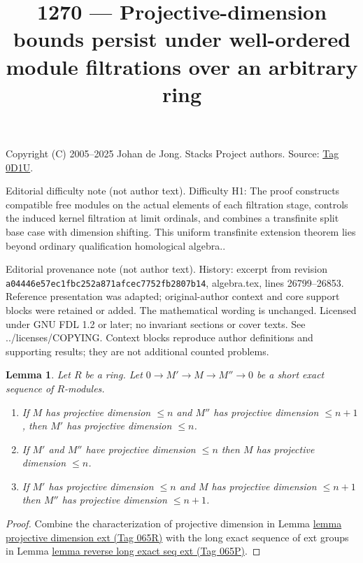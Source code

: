 \documentclass{amsart}
\theoremstyle{plain}
\newtheorem{lemma}[subsection]{Lemma}
\theoremstyle{definition}
\theoremstyle{remark}
\numberwithin{equation}{subsection}
\begin{document}
\title[Stacks Project, Tag 0D1U]{1270 --- Projective-dimension bounds persist under well-ordered module filtrations over an arbitrary ring}
\maketitle
\noindent Copyright (C) 2005--2025 Johan de Jong. Stacks Project authors. Source: \href{https://stacks.math.columbia.edu/tag/0D1U}{Tag 0D1U}.

\noindent Editorial difficulty note (not author text). Difficulty H1: The proof constructs compatible free modules on the actual elements of each filtration stage, controls the induced kernel filtration at limit ordinals, and combines a transfinite split base case with dimension shifting. This uniform transfinite extension theorem lies beyond ordinary qualification homological algebra..

\noindent Editorial provenance note (not author text). History: excerpt from revision \texttt{a0444\allowbreak 6e57e\allowbreak c1fbc\allowbreak 252a8\allowbreak 71afc\allowbreak ec775\allowbreak 2fb28\allowbreak 07b14}, algebra.tex, lines 26799--26853. Reference presentation was adapted; original-author context and core support blocks were retained or added. The mathematical wording is unchanged. Licensed under GNU FDL 1.2 or later; no invariant sections or cover texts. See ../licenses/COPYING. Context blocks reproduce author definitions and supporting results; they are not additional counted problems.

\begin{lemma}
\label{lemma-exact-sequence-projective-dimension}
Let $R$ be a ring. Let $0 \to M' \to M \to M'' \to 0$ be a short
exact sequence of $R$-modules.
\begin{enumerate}
\item If $M$ has projective dimension $\leq n$ and $M''$
has projective dimension $\leq n + 1$, then $M'$ has projective
dimension $\leq n$.
\item If $M'$ and $M''$ have projective dimension
$\leq n$ then $M$ has projective dimension $\leq n$.
\item If $M'$ has projective dimension $\leq n$ and
$M$ has projective dimension $\leq n + 1$ then
$M''$ has projective dimension $\leq n + 1$.
\end{enumerate}
\end{lemma}

\begin{proof}
Combine the characterization of projective dimension in
Lemma \href{https://stacks.math.columbia.edu/tag/065R}{lemma projective dimension ext (Tag 065R)}
with the long exact sequence of ext groups in
Lemma \href{https://stacks.math.columbia.edu/tag/065P}{lemma reverse long exact seq ext (Tag 065P)}.
\end{proof}
\end{document}
